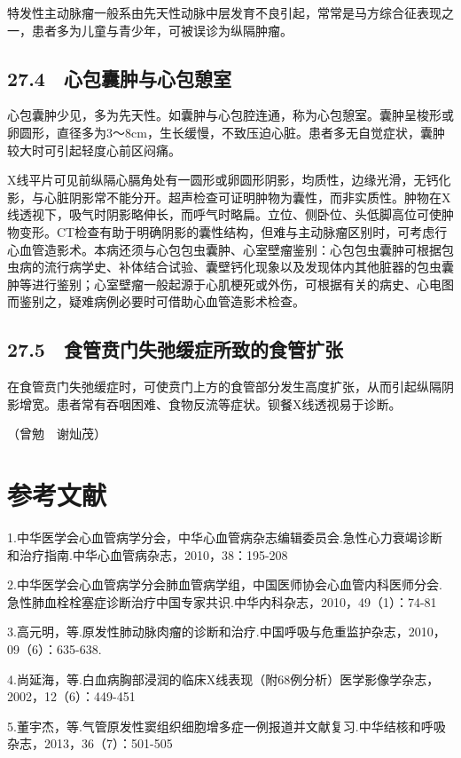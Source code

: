 特发性主动脉瘤一般系由先天性动脉中层发育不良引起，常常是马方综合征表现之一，患者多为儿童与青少年，可被误诊为纵隔肿瘤。

\subsection{27.4　心包囊肿与心包憩室}

心包囊肿少见，多为先天性。如囊肿与心包腔连通，称为心包憩室。囊肿呈梭形或卵圆形，直径多为3～8cm，生长缓慢，不致压迫心脏。患者多无自觉症状，囊肿较大时可引起轻度心前区闷痛。

X线平片可见前纵隔心膈角处有一圆形或卵圆形阴影，均质性，边缘光滑，无钙化影，与心脏阴影常不能分开。超声检查可证明肿物为囊性，而非实质性。肿物在X线透视下，吸气时阴影略伸长，而呼气时略扁。立位、侧卧位、头低脚高位可使肿物变形。CT检查有助于明确阴影的囊性结构，但难与主动脉瘤区别时，可考虑行心血管造影术。本病还须与心包包虫囊肿、心室壁瘤鉴别：心包包虫囊肿可根据包虫病的流行病学史、补体结合试验、囊壁钙化现象以及发现体内其他脏器的包虫囊肿等进行鉴别；心室壁瘤一般起源于心肌梗死或外伤，可根据有关的病史、心电图而鉴别之，疑难病例必要时可借助心血管造影术检查。

\subsection{27.5　食管贲门失弛缓症所致的食管扩张}

在食管贲门失弛缓症时，可使贲门上方的食管部分发生高度扩张，从而引起纵隔阴影增宽。患者常有吞咽困难、食物反流等症状。钡餐X线透视易于诊断。

（曾勉　谢灿茂）

\protect\hypertarget{text00083.html}{}{}

\section{参考文献}

1.中华医学会心血管病学分会，中华心血管病杂志编辑委员会.急性心力衰竭诊断和治疗指南.中华心血管病杂志，2010，38：195-208

2.中华医学会心血管病学分会肺血管病学组，中国医师协会心血管内科医师分会.急性肺血栓栓塞症诊断治疗中国专家共识.中华内科杂志，2010，49（1）：74-81

3.高元明，等.原发性肺动脉肉瘤的诊断和治疗.中国呼吸与危重监护杂志，2010，09（6）：635-638.

4.尚延海，等.白血病胸部浸润的临床X线表现（附68例分析）医学影像学杂志，2002，12（6）：449-451

5.董宇杰，等.气管原发性窦组织细胞增多症一例报道并文献复习.中华结核和呼吸杂志，2013，36（7）：501-505

